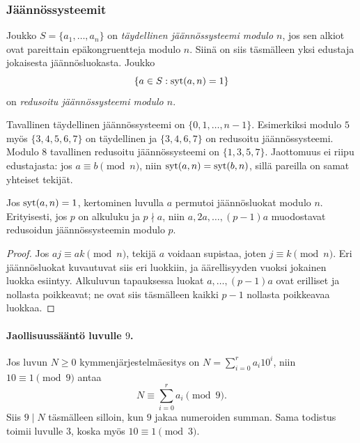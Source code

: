 \documentclass[11pt,a4paper]{amsart}
\begin{document}
\subsubsection{Jäännössysteemit}
\begin{definition}
  Joukko $S=\{a_1,\ldots,a_n\}$ on \emph{täydellinen jäännössysteemi
  modulo $n$}, jos sen alkiot ovat pareittain epäkongruentteja modulo
  $n$. Siinä on siis täsmälleen yksi edustaja jokaisesta
  jäännösluokasta. Joukko
  \[
    \{a\in S:\operatorname{syt}(a,n)=1\}
  \]
  on \emph{redusoitu jäännössysteemi modulo $n$}.
\end{definition}
Tavallinen täydellinen jäännössysteemi on $\{0,1,\ldots,n-1\}$.
Esimerkiksi modulo $5$ myös $\{3,4,5,6,7\}$ on täydellinen ja
$\{3,4,6,7\}$ on redusoitu jäännössysteemi. Modulo $8$ tavallinen
redusoitu jäännössysteemi on $\{1,3,5,7\}$.
Jaottomuus ei riipu edustajasta: jos $a\equiv b\pmod n$,
niin $\operatorname{syt}(a,n)=\operatorname{syt}(b,n)$, sillä pareilla on samat yhteiset tekijät.

\begin{lemma}
  Jos $\operatorname{syt}(a,n)=1$, kertominen luvulla $a$ permutoi jäännösluokat
  modulo $n$. Erityisesti, jos $p$ on alkuluku ja $p\nmid a$, niin
  $a,2a,\ldots,(p{-}1)a$ muodostavat redusoidun jäännössysteemin
  modulo $p$.
\end{lemma}
\begin{proof}
  Jos $aj\equiv ak\pmod n$, tekijä $a$ voidaan supistaa, joten
  $j\equiv k\pmod n$. Eri jäännösluokat kuvautuvat siis eri
  luokkiin, ja äärellisyyden vuoksi jokainen luokka esiintyy.
  Alkuluvun tapauksessa luokat $a,\ldots,(p-1)a$ ovat erilliset
  ja nollasta poikkeavat; ne ovat siis täsmälleen kaikki $p-1$
  nollasta poikkeavaa luokkaa.
\end{proof}

\paragraph{Jaollisuussääntö luvulle $9$.}
Jos luvun $N\ge0$ kymmenjärjestelmäesitys on
$N=\sum_{i=0}^r a_i10^i$, niin $10\equiv1\pmod9$ antaa
\[
  N\equiv\sum_{i=0}^r a_i\pmod9.
\]
Siis $9\mid N$ täsmälleen silloin, kun $9$ jakaa numeroiden summan.
Sama todistus toimii luvulle $3$, koska myös $10\equiv1\pmod3$.
\end{document}
